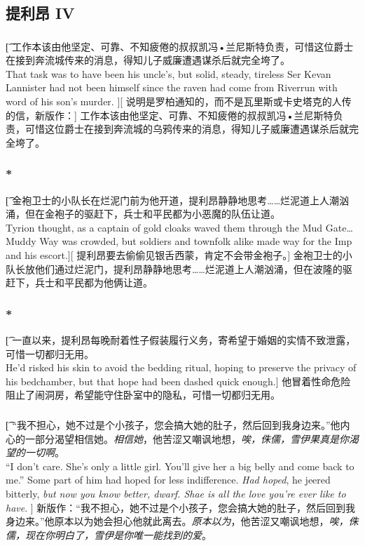 \documentclass[12pt,a4paper]{article}
\begin{document}
\subsection{提利昂 IV}
\subsubsection{}\t[
	工作本该由他坚定、可靠、不知疲倦的叔叔凯冯•兰尼斯特负责，可惜这位爵士在接到奔流城传来的消息，得知儿子威廉遭遇谋杀后就完全垮了。\\
	That task was to have been his uncle's, but solid, steady, tireless Ser Kevan Lannister had not been himself since the raven had come from Riverrun with word of his son's murder. ][
	说明是罗柏通知的，而不是瓦里斯或卡史塔克的人传的信，新版作：]
	工作本该由他坚定、可靠、不知疲倦的叔叔凯冯•兰尼斯特负责，可惜这位爵士在接到奔流城的乌鸦传来的消息，得知儿子威廉遭遇谋杀后就完全垮了。
	
\subsubsection{\color{red}*}\t[
	金袍卫士的小队长在烂泥门前为他开道，提利昂静静地思考……烂泥道上人潮汹涌，但在金袍子的驱赶下，兵士和平民都为小恶魔的队伍让道。\\
	Tyrion thought, as a captain of gold cloaks waved them through the Mud Gate\ldots Muddy Way was crowded, but soldiers and townfolk alike made way for the Imp and his escort.][
	提利昂要去偷偷见银舌西蒙，肯定不会带金袍子。]
	金袍卫士的小队长放他们通过烂泥门，提利昂静静地思考……烂泥道上人潮汹涌，但在波隆的驱赶下，兵士和平民都为他俩让道。
	
\subsubsection{\color{red}*}\t[
	一直以来，提利昂每晚耐着性子假装履行义务，寄希望于婚姻的实情不致泄露，可惜一切都归无用。\\
	He'd risked his skin to avoid the bedding ritual, hoping to preserve the privacy of his bedchamber, but that hope had been dashed quick enough.]
	他冒着性命危险阻止了闹洞房，希望能守住卧室中的隐私，可惜一切都归无用。
	
\subsubsection{}\t[
	“我不担心，她不过是个小孩子，您会搞大她的肚子，然后回到我身边来。”他内心的一部分渴望相信她。\emph{相信她}，他苦涩又嘲讽地想，\emph{唉，侏儒，雪伊果真是你渴望的一切啊}。\\
	“I don't care. She's only a little girl. You'll give her a big belly and come back to me.” Some part of him had hoped for less indifference. \emph{Had hoped}, he jeered bitterly, \emph{but now you know better, dwarf. Shae is all the love you're ever like to have}. ]
	新版作：“我不担心，她不过是个小孩子，您会搞大她的肚子，然后回到我身边来。”他原本以为她会担心他就此离去。\emph{原本以为}，他苦涩又嘲讽地想，\emph{唉，侏儒，现在你明白了，雪伊是你唯一能找到的爱}。
	
\end{document}
